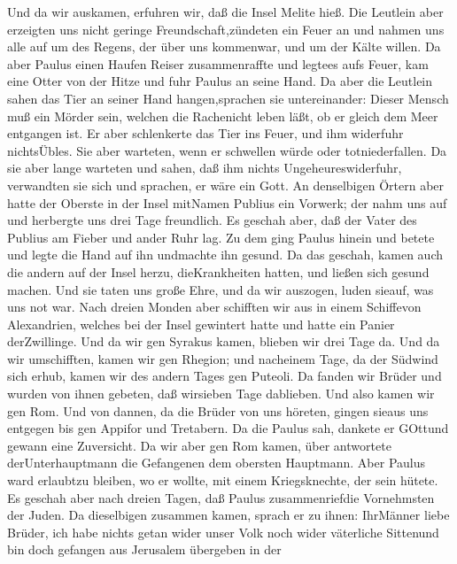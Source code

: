  Und da wir auskamen, erfuhren wir, daß die Insel Melite
hieß.  Die Leutlein aber erzeigten uns nicht geringe
Freundschaft,zündeten ein Feuer an und nahmen uns alle auf um des
Regens, der über uns kommenwar, und um der Kälte willen.  Da
aber Paulus einen Haufen Reiser zusammenraffte und legtees aufs Feuer,
kam eine Otter von der Hitze und fuhr Paulus an seine Hand. 
Da aber die Leutlein sahen das Tier an seiner Hand hangen,sprachen sie
untereinander: Dieser Mensch muß ein Mörder sein, welchen die Rachenicht
leben läßt, ob er gleich dem Meer entgangen ist.  Er aber
schlenkerte das Tier ins Feuer, und ihm widerfuhr nichtsÜbles.
 Sie aber warteten, wenn er schwellen würde oder
totniederfallen. Da sie aber lange warteten und sahen, daß ihm nichts
Ungeheureswiderfuhr, verwandten sie sich und sprachen, er wäre ein Gott.
 An denselbigen Örtern aber hatte der Oberste in der Insel
mitNamen Publius ein Vorwerk; der nahm uns auf und herbergte uns drei
Tage freundlich.  Es geschah aber, daß der Vater des Publius
am Fieber und ander Ruhr lag. Zu dem ging Paulus hinein und betete und
legte die Hand auf ihn undmachte ihn gesund.  Da das
geschah, kamen auch die andern auf der Insel herzu, dieKrankheiten
hatten, und ließen sich gesund machen.  Und sie taten uns
große Ehre, und da wir auszogen, luden sieauf, was uns not war.
 Nach dreien Monden aber schifften wir aus in einem
Schiffevon Alexandrien, welches bei der Insel gewintert hatte und hatte
ein Panier derZwillinge.  Und da wir gen Syrakus kamen,
blieben wir drei Tage da.  Und da wir umschifften, kamen
wir gen Rhegion; und nacheinem Tage, da der Südwind sich erhub, kamen
wir des andern Tages gen Puteoli.  Da fanden wir Brüder und
wurden von ihnen gebeten, daß wirsieben Tage dablieben. Und also kamen
wir gen Rom.  Und von dannen, da die Brüder von uns
höreten, gingen sieaus uns entgegen bis gen Appifor und Tretabern. Da
die Paulus sah, dankete er GOttund gewann eine Zuversicht. 
Da wir aber gen Rom kamen, über antwortete derUnterhauptmann die
Gefangenen dem obersten Hauptmann. Aber Paulus ward erlaubtzu bleiben,
wo er wollte, mit einem Kriegsknechte, der sein hütete.  Es
geschah aber nach dreien Tagen, daß Paulus zusammenriefdie Vornehmsten
der Juden. Da dieselbigen zusammen kamen, sprach er zu ihnen: IhrMänner
liebe Brüder, ich habe nichts getan wider unser Volk noch wider
väterliche Sittenund bin doch gefangen aus Jerusalem übergeben in der
